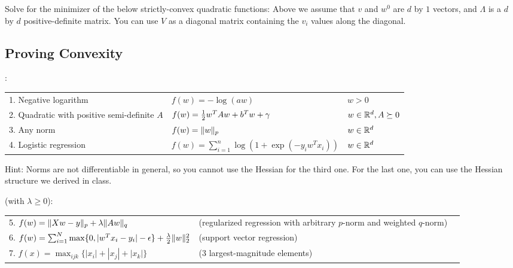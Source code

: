 \documentclass{article}
\begin{document}
Solve for the minimizer of the below strictly-convex quadratic functions:
Above we assume that $v$ and $w^0$ are $d$ by $1$ vectors, and $\Lambda$ is a $d$ by $d$ positive-definite matrix. You can use $V$ as a diagonal matrix containing the $v_i$ values along the diagonal.



\subsection{Proving Convexity}

:
\begin{center}
\begin{tabular}{lll}
1. Negative logarithm & $f(w) = -\log(aw) $ & $w > 0$\\
2. Quadratic with positive semi-definite $A$ & $f(w) = \frac 1 2 w^TAw + b^Tw + \gamma$ & $w \in \mathbb{R}^d, A \succeq 0$ \\
3. Any norm & $f(w) = \|w\|_p$ & $w \in \mathbb{R}^d$\\
4. Logistic regression & $f(w) = \sum_{i=1}^n \log(1+\exp(-y_iw^Tx_i))$ & $w \in \mathbb{R}^d$
\end{tabular}
\end{center}

Hint: Norms are not differentiable in general, so you cannot use the Hessian for the third one. For the last one, you can use the Hessian structure we derived in class.

 (with $\lambda \geq 0$):
\begin{center}
\begin{tabular}{lll}
5. $f(w) = \|Xw - y\|_p + \lambda\|Aw\|_q$ & (regularized regression with arbitrary $p$-norm and weighted $q$-norm)\\
6. $f(w) = \sum_{i=1}^N\max\{0, |w^Tx_i - y_i| - \epsilon\} + \frac{\lambda}{2}\|w\|_2^2$ & (support vector regression)\\
7. $f(x) = \max_{ijk}\{|x_i| + |x_j| + |x_k|\}$ & ($3$ largest-magnitude elements) 
\end{tabular}
\end{center}
\end{document}
